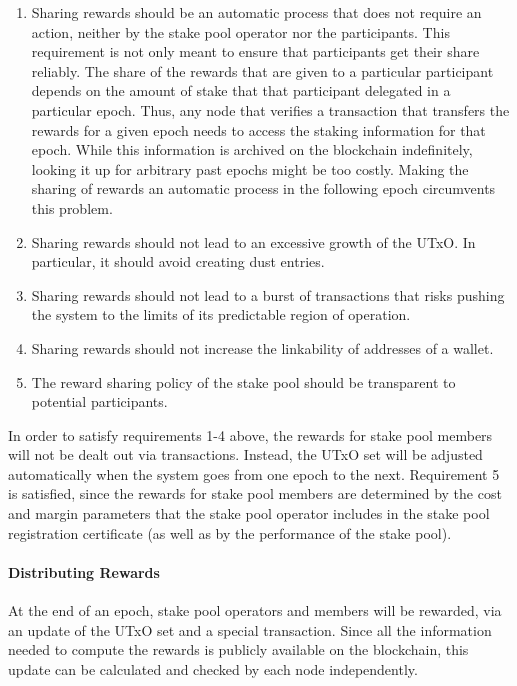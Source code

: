 \documentclass[11pt,a4paper]{article}
\begin{document}
\begin{enumerate}
\def\labelenumi{\arabic{enumi}.}
\item
  Sharing rewards should be an automatic process that does not require
  an action, neither by the stake pool operator nor the participants.
  This requirement is not only meant to ensure that participants get
  their share reliably. The share of the rewards that are given to a
  particular participant depends on the amount of stake that that
  participant delegated in a particular epoch. Thus, any node that
  verifies a transaction that transfers the rewards for a given epoch
  needs to access the staking information for that epoch. While this
  information is archived on the blockchain indefinitely, looking it up
  for arbitrary past epochs might be too costly. Making the sharing of
  rewards an automatic process in the following epoch circumvents this
  problem.
\item
  Sharing rewards should not lead to an excessive growth of the UTxO. In
  particular, it should avoid creating dust entries.
\item
  Sharing rewards should not lead to a burst of transactions that risks
  pushing the system to the limits of its predictable region of
  operation.
\item
  Sharing rewards should not increase the linkability of addresses of a
  wallet.
\item
  The reward sharing policy of the stake pool should be transparent to
  potential participants.
\end{enumerate}

In order to satisfy requirements 1-4 above, the rewards for stake pool
members will not be dealt out via transactions. Instead, the UTxO set
will be adjusted automatically when the system goes from one epoch to
the next. Requirement 5 is satisfied, since the rewards for stake pool
members are determined by the cost and margin parameters that the stake
pool operator includes in the stake pool registration certificate (as
well as by the performance of the stake pool).

\paragraph{Distributing Rewards}\label{distributing-rewards}

At the end of an epoch, stake pool operators and members will be
rewarded, via an update of the UTxO set and a special transaction. Since
all the information needed to compute the rewards is publicly available
on the blockchain, this update can be calculated and checked by each
node independently.
\end{document}
